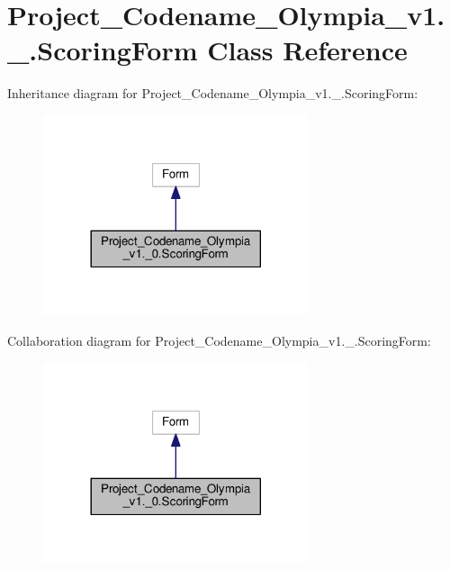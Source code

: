 \hypertarget{classProject__Codename__Olympia__v1_1_1__0_1_1ScoringForm}{}\section{Project\+\_\+\+Codename\+\_\+\+Olympia\+\_\+v1.\+\_.\+Scoring\+Form Class Reference}
\label{classProject__Codename__Olympia__v1_1_1__0_1_1ScoringForm}


Inheritance diagram for Project\+\_\+\+Codename\+\_\+\+Olympia\+\_\+v1.\+\_.\+Scoring\+Form\+:
\nopagebreak
\begin{figure}[H]
\begin{center}
\leavevmode
\includegraphics[width=221pt]{classProject__Codename__Olympia__v1_1_1__0_1_1ScoringForm__inherit__graph}
\end{center}
\end{figure}


Collaboration diagram for Project\+\_\+\+Codename\+\_\+\+Olympia\+\_\+v1.\+\_.\+Scoring\+Form\+:
\nopagebreak
\begin{figure}[H]
\begin{center}
\leavevmode
\includegraphics[width=221pt]{classProject__Codename__Olympia__v1_1_1__0_1_1ScoringForm__coll__graph}
\end{center}
\end{figure}
